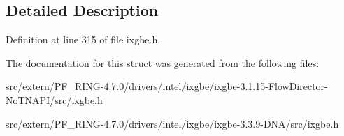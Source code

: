 \subsection{Detailed Description}


Definition at line 315 of file ixgbe.h.



The documentation for this struct was generated from the following files:\begin{DoxyCompactItemize}
\item 
src/extern/PF\_\-RING-\/4.7.0/drivers/intel/ixgbe/ixgbe-\/3.1.15-\/FlowDirector-\/NoTNAPI/src/ixgbe.h\item 
src/extern/PF\_\-RING-\/4.7.0/drivers/intel/ixgbe/ixgbe-\/3.3.9-\/DNA/src/ixgbe.h\end{DoxyCompactItemize}
